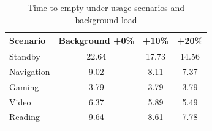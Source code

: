 \begin{table}[htbp]
\centering
\caption{Time-to-empty under usage scenarios and background load}
\label{tab:tte_scenarios}
\begin{tabular}{lccc}
\hline
Scenario & Background +0\% & +10\% & +20\% \\
\hline
Standby & 22.64 & 17.73 & 14.56 \\
Navigation & 9.02 & 8.11 & 7.37 \\
Gaming & 3.79 & 3.79 & 3.79 \\
Video & 6.37 & 5.89 & 5.49 \\
Reading & 9.64 & 8.61 & 7.78 \\
\hline
\end{tabular}
\end{table}
